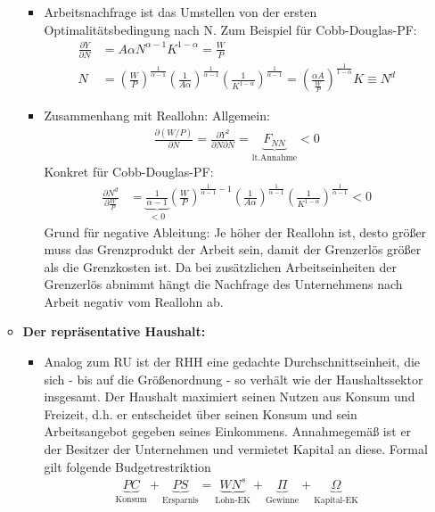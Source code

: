 \documentclass{scrartcl}
\begin{document}
\begin{enumerate}
\begin{itemize}
\begin{itemize}
    \item Arbeitsnachfrage ist das Umstellen von der ersten Optimalit\"{a}tsbedingung nach N. Zum Beispiel f\"{u}r Cobb-Douglas-PF:
        \begin{align*}
          \frac{\partial Y}{\partial N} &= A \alpha N^{\alpha-1}K^{1-\alpha} =\frac{W}{P}\\
          N &= \left(\frac{W}{P}\right)^\frac{1}{\alpha-1} \left(\frac{1}{A \alpha}\right)^\frac{1}{\alpha-1} \left(\frac{1}{K^{1-\alpha}}\right)^\frac{1}{\alpha-1} =  \left(\frac{\alpha A}{\frac{W}{P}}\right)^{\frac{1}{1-\alpha}}K \equiv N^d
          \end{align*}
    \item Zusammenhang mit Reallohn: Allgemein:
    \begin{align*}
      \frac{\partial(W/P)}{\partial N} = \frac{\partial Y^2}{\partial N \partial N}= \underbrace{F_{NN}}_\text{lt.Annahme} <0
    \end{align*}
    Konkret f\"{u}r Cobb-Douglas-PF:
          \begin{align*}
          \frac{\partial N^d}{\partial \frac{W}{P}} &= \underbrace{\frac{1}{\alpha-1}}_{<0} \left(\frac{W}{P}\right)^{\frac{1}{\alpha-1}-1} \left(\frac{1}{A \alpha}\right)^\frac{1}{\alpha-1} \left(\frac{1}{K^{1-\alpha}}\right)^\frac{1}{\alpha-1} <0
        \end{align*}
        Grund f\"{u}r negative Ableitung: Je h\"{o}her der Reallohn ist, desto gr\"{o}{\ss}er muss das Grenzprodukt der Arbeit sein, damit der Grenzerl\"{o}s gr\"{o}{\ss}er als die Grenzkosten ist. Da bei zus\"{a}tzlichen Arbeitseinheiten der Grenzerl\"{o}s abnimmt h\"{a}ngt die Nachfrage des Unternehmens nach Arbeit negativ vom Reallohn ab.
  \end{itemize}
  \item \textbf{Der repr\"{a}sentative Haushalt:}
  \begin{itemize}
    \item Analog zum RU ist der RHH eine gedachte Durchschnittseinheit, die sich - bis auf die Gr\"{o}{\ss}enordnung - so verh\"{a}lt wie der Haushaltssektor insgesamt. Der Haushalt maximiert seinen Nutzen aus Konsum und Freizeit, d.h. er entscheidet \"{u}ber seinen Konsum und sein Arbeitsangebot gegeben seines Einkommens. Annahmegem\"{a}{\ss} ist er der Besitzer der Unternehmen und vermietet Kapital an diese. Formal gilt folgende Budgetrestriktion
        \begin{align*}
          \underbrace{P C}_\text{Konsum} + \underbrace{P S}_\text{Ersparnis} = \underbrace{WN^s}_\text{Lohn-EK} + \underbrace{\Pi}_\text{Gewinne} + \underbrace{\Omega}_\text{Kapital-EK}

\end{align*}
\end{itemize}
\end{itemize}
\end{enumerate}
\end{document}
